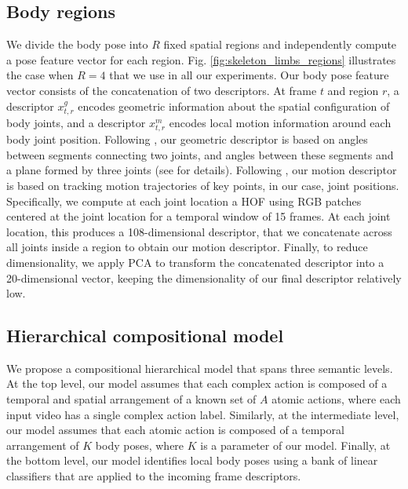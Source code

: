 \subsection{Body regions}
We divide the body pose into $R$ fixed spatial regions and independently compute 
a pose feature vector for each region. Fig. \ref{fig:skeleton_limbs_regions} 
illustrates the case when $R = 4$ that we use in all our experiments. Our body 
pose feature vector consists of the concatenation of two descriptors. At frame 
$t$ and region $r$, a descriptor $x^{g}_{t,r}$ encodes geometric information 
about the spatial configuration of body joints, and a descriptor $x^{m}_{t,r}$ 
encodes local motion information around each body joint position. Following 
\cite{Lillo2014}, our geometric descriptor is based on angles between segments 
connecting two joints, and angles between these segments and a plane formed by 
three joints (see \cite{Lillo2014} for details). Following \cite{WangCVPR2011}, 
our motion descriptor is based on tracking motion trajectories of key points, in 
our case, joint positions. Specifically, we compute at each joint location a HOF 
using RGB patches centered at the joint location for a temporal window of 15 
frames. At each joint location, this produces a 108-dimensional descriptor,  
that we concatenate across all joints inside a region to obtain our motion descriptor. Finally, 
to reduce dimensionality, we apply PCA to transform the concatenated descriptor 
into a 20-dimensional vector, keeping the dimensionality of our final descriptor 
relatively low.


\subsection{Hierarchical compositional model}

We propose a compositional hierarchical model that spans three semantic levels. 
At the top level, our model assumes that each complex action is composed of a 
temporal and spatial arrangement of a known set of $A$ atomic actions, where 
each input video has a single complex action label. Similarly, at the 
intermediate level, our model assumes that each atomic action is composed of a 
temporal arrangement of $K$ body poses, where $K$ is a parameter of 
our model. Finally, at the bottom level, our model identifies local body poses 
using a bank of linear classifiers that are applied to the incoming frame 
descriptors. 

